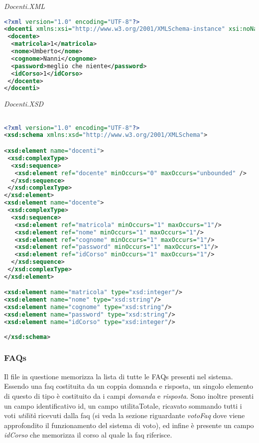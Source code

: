 \documentclass [a4paper,11pt]{book}
\begin{document}
\medskip

\emph{Docenti.XML}

\begin{lstlisting}[language=XML]
<?xml version="1.0" encoding="UTF-8"?>
<docenti xmlns:xsi="http://www.w3.org/2001/XMLSchema-instance" xsi:noNamespaceSchemaLocation="docenti.xsd">
 <docente>
  <matricola>1</matricola>
  <nome>Umberto</nome>
  <cognome>Nanni</cognome>
  <password>meglio che niente</password>
  <idCorso>1</idCorso>
 </docente>
</docenti>
\end{lstlisting}

\medskip

\emph{Docenti.XSD}

\begin{lstlisting}[language=XML]

<?xml version="1.0" encoding="UTF-8"?>
<xsd:schema xmlns:xsd="http://www.w3.org/2001/XMLSchema">

<xsd:element name="docenti">
 <xsd:complexType>
  <xsd:sequence>
   <xsd:element ref="docente" minOccurs="0" maxOccurs="unbounded" />
  </xsd:sequence>
 </xsd:complexType>
</xsd:element>
<xsd:element name="docente">
 <xsd:complexType>
  <xsd:sequence>
   <xsd:element ref="matricola" minOccurs="1" maxOccurs="1"/>
   <xsd:element ref="nome" minOccurs="1" maxOccurs="1"/>
   <xsd:element ref="cognome" minOccurs="1" maxOccurs="1"/>
   <xsd:element ref="password" minOccurs="1" maxOccurs="1"/>
   <xsd:element ref="idCorso" minOccurs="1" maxOccurs="1"/>
  </xsd:sequence>
 </xsd:complexType>
</xsd:element>

<xsd:element name="matricola" type="xsd:integer"/>
<xsd:element name="nome" type="xsd:string"/>
<xsd:element name="cognome" type="xsd:string"/>
<xsd:element name="password" type="xsd:string"/>
<xsd:element name="idCorso" type="xsd:integer"/>
  
</xsd:schema>
\end{lstlisting}

\medskip

\subsubsection{FAQs}

Il file in questione memorizza la lista di tutte le FAQs presenti nel sistema. Essendo una faq costituita da un coppia domanda e risposta, un singolo elemento di questo di tipo è costituito da i campi \emph{domanda} e \emph{risposta}. Sono inoltre presenti un campo identificativo id, un campo utilitaTotale, ricavato sommando tutti i voti \emph{utilità} ricevuti dalla faq (si veda la sezione riguardante \emph{votoFaq} dove viene approfondito il funzionamento del sistema di voto), ed infine è presente un campo \emph{idCorso} che memorizza il corso al quale la faq riferisce.
\end{document}
